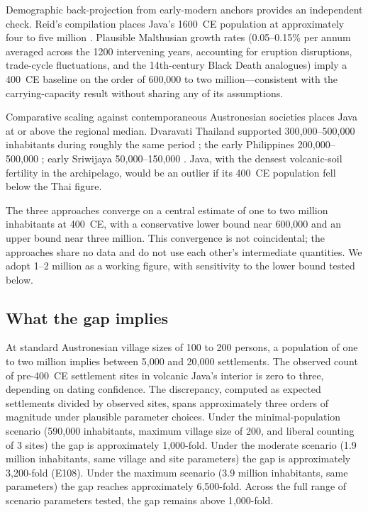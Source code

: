 \documentclass[12pt,a4paper]{article}
\begin{document}
Demographic back-projection from early-modern anchors provides an independent check. Reid's compilation places Java's 1600~CE population at approximately four to five million \citep{reid1988}. Plausible Malthusian growth rates (0.05--0.15\% per annum averaged across the 1200 intervening years, accounting for eruption disruptions, trade-cycle fluctuations, and the 14th-century Black Death analogues) imply a 400~CE baseline on the order of 600{,}000 to two million---consistent with the carrying-capacity result without sharing any of its assumptions.

Comparative scaling against contemporaneous Austronesian societies places Java at or above the regional median. Dvaravati Thailand supported 300{,}000--500{,}000 inhabitants during roughly the same period \citep{higham2014}; the early Philippines 200{,}000--500{,}000 \citep{junker1999}; early Sriwijaya 50{,}000--150{,}000 \citep{manguin2004}. Java, with the densest volcanic-soil fertility in the archipelago, would be an outlier if its 400~CE population fell below the Thai figure.

The three approaches converge on a central estimate of one to two million inhabitants at 400~CE, with a conservative lower bound near 600{,}000 and an upper bound near three million. This convergence is not coincidental; the approaches share no data and do not use each other's intermediate quantities. We adopt 1--2 million as a working figure, with sensitivity to the lower bound tested below.

\subsection{What the gap implies}

At standard Austronesian village sizes of 100 to 200 persons, a population of one to two million implies between 5{,}000 and 20{,}000 settlements. The observed count of pre-400~CE settlement sites in volcanic Java's interior is zero to three, depending on dating confidence. The discrepancy, computed as expected settlements divided by observed sites, spans approximately three orders of magnitude under plausible parameter choices. Under the minimal-population scenario (590{,}000 inhabitants, maximum village size of 200, and liberal counting of 3 sites) the gap is approximately 1{,}000-fold. Under the moderate scenario (1{.}9 million inhabitants, same village and site parameters) the gap is approximately 3{,}200-fold (E108). Under the maximum scenario (3{.}9 million inhabitants, same parameters) the gap reaches approximately 6{,}500-fold. Across the full range of scenario parameters tested, the gap remains above 1{,}000-fold.
\end{document}

